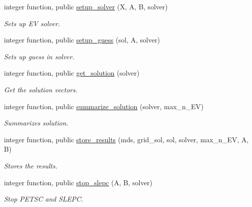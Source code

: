 \begin{DoxyCompactItemize}
integer function, public \hyperlink{namespaceslepc__ops_af2eb258cbc9d353b95fa71d38570afad}{setup\+\_\+solver} (X, A, B, solver)
\begin{DoxyCompactList}\small\item\em Sets up EV solver. \end{DoxyCompactList}\item 
integer function, public \hyperlink{namespaceslepc__ops_a17a57b58ac6ca48ff4bdb44e8689bb19}{setup\+\_\+guess} (sol, A, solver)
\begin{DoxyCompactList}\small\item\em Sets up guess in solver. \end{DoxyCompactList}\item 
integer function, public \hyperlink{namespaceslepc__ops_aabe2aef90f039316bf3f03e651a6e7e0}{get\+\_\+solution} (solver)
\begin{DoxyCompactList}\small\item\em Get the solution vectors. \end{DoxyCompactList}\item 
integer function, public \hyperlink{namespaceslepc__ops_a03193dbc55e7061891d58e96a2bf1dd5}{summarize\+\_\+solution} (solver, max\+\_\+n\+\_\+\+EV)
\begin{DoxyCompactList}\small\item\em Summarizes solution. \end{DoxyCompactList}\item 
integer function, public \hyperlink{namespaceslepc__ops_a24d97496000ed55f1d11e4d436e084a6}{store\+\_\+results} (mds, grid\+\_\+sol, sol, solver, max\+\_\+n\+\_\+\+EV, A, B)
\begin{DoxyCompactList}\small\item\em Stores the results. \end{DoxyCompactList}\item 
integer function, public \hyperlink{namespaceslepc__ops_aeeac6908b3988f395314e7769829a058}{stop\+\_\+slepc} (A, B, solver)
\begin{DoxyCompactList}\small\item\em Stop P\+E\+T\+SC and S\+L\+E\+PC. \end{DoxyCompactList}\end{DoxyCompactItemize}
